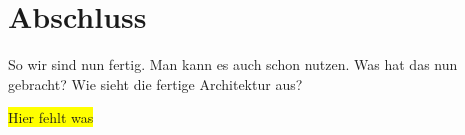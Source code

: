 \section{Abschluss}
So wir sind nun fertig. Man kann es auch schon nutzen. Was hat das nun gebracht? Wie sieht die fertige Architektur aus?

\colorbox{yellow}{Hier fehlt was}